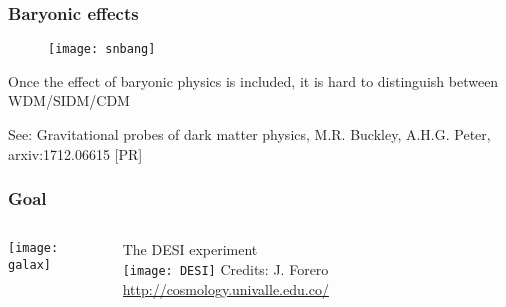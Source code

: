 \begin{frame}
  \frametitle{Baryonic effects}
  \begin{figure}
    \centering
    \texttt{[image: snbang]}
  \end{figure}
  Once the effect of baryonic physics is included, it is
  hard to distinguish between WDM/SIDM/CDM

  \begin{center}
    	
\footnotesize See: Gravitational probes of dark matter physics, M.R. Buckley, A.H.G. Peter, arxiv:1712.06615 [PR]
  \end{center}
\end{frame}

\begin{frame}
  \frametitle{Goal}
  \begin{columns}
  \begin{column}{0.65\textwidth}
  \texttt{[image: galax]}     
  \end{column}
  \begin{column}{0.25\textwidth}
    The DESI experiment\\
    \texttt{[image: DESI]}
    {\tiny Credits: J. Forero \url{http://cosmology.univalle.edu.co/} }
  \end{column}
\end{columns}


\end{frame}

